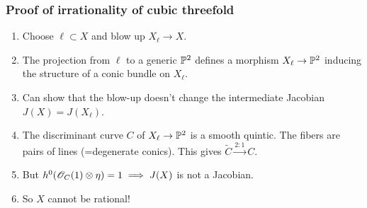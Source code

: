 \begin{frame}
\frametitle{Proof of irrationality of cubic threefold}

\begin{enumerate}
	\item Choose $\ell \subset X$ and blow up $X_\ell \to X$.
	\pause
	\item The projection from $\ell$ to a generic $\P^2$ defines a morphism $X_\ell \to \P^2$ inducing the structure of a conic bundle on $X_\ell$.
	\pause
	\item Can show that the blow-up doesn't change the intermediate Jacobian $J(X)=J(X_\ell)$.
	\pause
	\item The discriminant curve $C$ of $X_\ell \to \P^2$ is a smooth quintic. The fibers are pairs of lines (=degenerate conics). This gives $\widetilde C \xrightarrow{2:1} C$.
	\pause
	\item But $h^0(\OO_C(1) \otimes \eta)=1 \implies J(X)$ is not a Jacobian.
	\pause
	\item So $X$ cannot be rational!
\end{enumerate}

\end{frame}